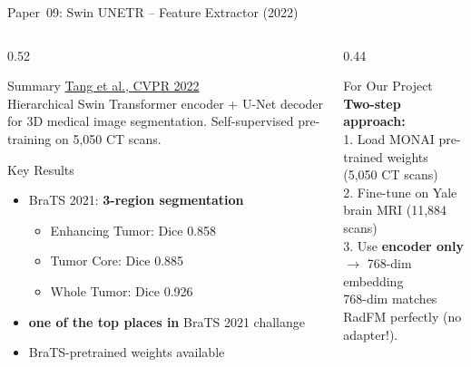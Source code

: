 \documentclass[aspectratio=169,xcolor=dvipsnames]{beamer}
\begin{document}
\begin{frame}{Paper~09: Swin UNETR -- Feature Extractor (2022)}
    \begin{columns}
        \begin{column}{0.52\textwidth}
            \begin{block}{Summary}
                \small
                \href{https://arxiv.org/abs/2201.01266}{Tang et al., CVPR 2022}\\[0.3em]
                Hierarchical Swin Transformer encoder + U-Net decoder for 3D medical image segmentation. Self-supervised pre-training on 5,050 CT scans.
            \end{block}

            \vspace{0.2em}

            \begin{block}{Key Results}
                \small
                \begin{itemize}
                    \item BraTS 2021: \textbf{3-region segmentation}
                        \begin{itemize}
                            \scriptsize
                            \item Enhancing Tumor: Dice 0.858
                            \item Tumor Core: Dice 0.885
                            \item Whole Tumor: Dice 0.926
                        \end{itemize}
                    \item \textbf{one of the top places in} BraTS 2021 challange
                    \item BraTS-pretrained weights available
                \end{itemize}
            \end{block}
        \end{column}

        \begin{column}{0.44\textwidth}
            \begin{alertblock}{For Our Project}
                \small
                \textbf{Two-step approach:}\\[0.2em]
                \scriptsize
                1. Load MONAI pre-trained weights (5,050 CT scans)\\
                2. Fine-tune on Yale brain MRI (11,884 scans)\\
                3. Use \textbf{encoder only} $\to$ 768-dim embedding\\[0.2em]
                768-dim matches RadFM perfectly (no adapter!).
            \end{alertblock}


\end{column}
\end{columns}
\end{frame}
\end{document}
